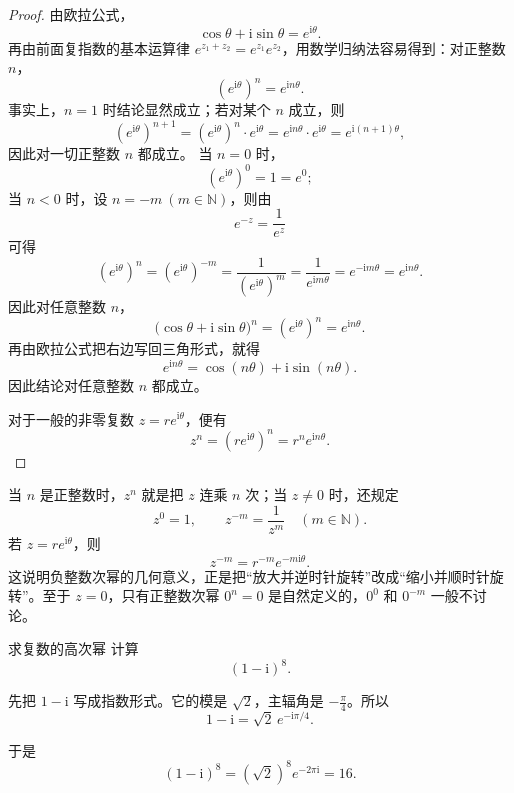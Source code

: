 \begin{proof}
由欧拉公式，
\[
\cos\theta+\mathrm{i}\sin\theta=e^{\mathrm{i}\theta}.
\]
再由前面复指数的基本运算律 $e^{z_1+z_2}=e^{z_1}e^{z_2}$，用数学归纳法容易得到：对正整数 $n$，
\[
(e^{\mathrm{i}\theta})^n=e^{\mathrm{i}n\theta}.
\]
事实上，$n=1$ 时结论显然成立；若对某个 $n$ 成立，则
\[
(e^{\mathrm{i}\theta})^{n+1}=(e^{\mathrm{i}\theta})^n\cdot e^{\mathrm{i}\theta}=e^{\mathrm{i}n\theta}\cdot e^{\mathrm{i}\theta}=e^{\mathrm{i}(n+1)\theta},
\]
因此对一切正整数 $n$ 都成立。
当 $n=0$ 时，
\[
(e^{\mathrm{i}\theta})^0=1=e^0;
\]
当 $n<0$ 时，设 $n=-m\ (m\in\mathbb{N})$，则由
\[
e^{-z}=\frac{1}{e^z}
\]
可得
\[
(e^{\mathrm{i}\theta})^n=(e^{\mathrm{i}\theta})^{-m}
=\frac{1}{(e^{\mathrm{i}\theta})^m}
=\frac{1}{e^{\mathrm{i}m\theta}}
=e^{-\mathrm{i}m\theta}
=e^{\mathrm{i}n\theta}.
\]
因此对任意整数 $n$，
\[
\bigl(\cos\theta+\mathrm{i}\sin\theta\bigr)^n=(e^{\mathrm{i}\theta})^n=e^{\mathrm{i}n\theta}.
\]
再由欧拉公式把右边写回三角形式，就得
\[
e^{\mathrm{i}n\theta}=\cos(n\theta)+\mathrm{i}\sin(n\theta).
\]
因此结论对任意整数 $n$ 都成立。

对于一般的非零复数 $z=re^{\mathrm{i}\theta}$，便有
\[
z^n = (re^{\mathrm{i}\theta})^n=r^n e^{\mathrm{i}n\theta}.
\]
\end{proof}

\begin{tishi}[正幂、零次幂和负幂该怎样理解]
当 $n$ 是正整数时，$z^n$ 就是把 $z$ 连乘 $n$ 次；当 $z\neq 0$ 时，还规定
\[
z^0=1,\qquad z^{-m}=\frac{1}{z^m}\quad (m\in\mathbb{N}).
\]
若 $z=re^{\mathrm{i}\theta}$，则
\[
z^{-m}=r^{-m}e^{-m\mathrm{i}\theta}.
\]
这说明负整数次幂的几何意义，正是把``放大并逆时针旋转''改成``缩小并顺时针旋转''。至于 $z=0$，只有正整数次幂 $0^n=0$ 是自然定义的，$0^0$ 和 $0^{-m}$ 一般不讨论。
\end{tishi}

\begin{lizi}{求复数的高次幂}{}
计算
\[
(1-\mathrm{i})^8.
\]

\begin{jie}
先把 $1-\mathrm{i}$ 写成指数形式。它的模是 $\sqrt{2}$，主辐角是 $-\frac{\pi}{4}$。所以
\[
1-\mathrm{i}=\sqrt{2}\,e^{-\mathrm{i}\pi/4}.
\]

于是
\[
(1-\mathrm{i})^8=(\sqrt{2})^8 e^{-2\pi\mathrm{i}}=16.
\]
\end{jie}
\end{lizi}

